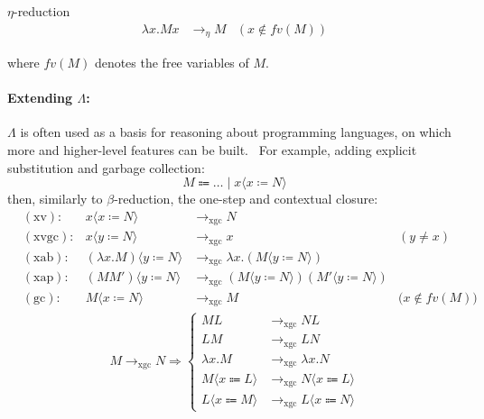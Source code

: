 \begin{defn}$\eta$-reduction\label{def:types:eta-reduction}
	$$
	\begin{aligned}
	\lambda{x}.Mx &\to_{\eta} M &(x\notin{fv(M)})
	\end{aligned}
	$$
\end{defn} where $fv(M)$ denotes the free variables of $M$.

\paragraph{Extending $\Lambda$:}\label{bg:types:extending-lambda}

$\Lambda$ is often used as a basis for reasoning about programming languages, on which more and higher-level features can be built.~\cite{tpl} For example, adding explicit substitution and garbage collection: $$
M \Coloneqq \dots \mid x\langle{x \coloneqq N}\rangle
$$ then, similarly to $\beta$-reduction, the one-step and contextual closure:~\cite{lambda_xgc, tsfpl}
$$
\begin{aligned}
	&(\textrm{xv})\colon &x\langle{x \coloneqq N}\rangle &\to_{\textrm{xgc}} N \\
	&(\textrm{xvgc})\colon &x\langle{y \coloneqq N}\rangle &\to_{\textrm{xgc}} x &(y \neq x) \\
	&(\textrm{xab})\colon &(\lambda{x}.M)\langle{y \coloneqq N}\rangle &\to_{\textrm{xgc}} \lambda{x}.(M\langle{y \coloneqq N}\rangle) \\
	&(\textrm{xap})\colon &(MM')\langle{y \coloneqq N}\rangle &\to_{\textrm{xgc}} (M\langle{y \coloneqq N}\rangle)(M'\langle{y \coloneqq N}\rangle) \\
	&(\textrm{gc})\colon &M\langle{x \coloneqq N}\rangle &\to_{\textrm{xgc}} M &\big(x \notin fv(M)\big)
\end{aligned}
$$$$
\begin{aligned}
	M \to_{\textrm{xgc}} N \Rightarrow \begin{cases}
		ML &\to_{\textrm{xgc}} NL \\
		LM &\to_{\textrm{xgc}} LN \\
		\lambda{x}.M &\to_{\textrm{xgc}} \lambda{x}.N \\
		M\langle{x \Coloneqq L}\rangle &\to_{\textrm{xgc}} N\langle{x \Coloneqq L}\rangle \\
		L\langle{x \Coloneqq M}\rangle &\to_{\textrm{xgc}} L\langle{x \Coloneqq N}\rangle
	\end{cases}
\end{aligned}
$$

